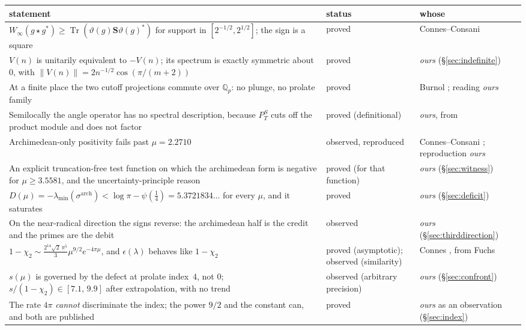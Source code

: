 \documentclass[11pt,a4paper]{article}
\theoremstyle{plain}
\theoremstyle{definition}
\theoremstyle{remark}
\newcommand{\Q}{\mathbb{Q}}
\newcommand{\Sonin}{\mathbf{S}}
\begin{document}
\begin{center}\small
\begin{tabular}{@{}p{}p{}p{}@{}}
\hline
statement & status & whose \\
\hline
$W_\infty(g\star g^*)\ge\operatorname{Tr}(\vartheta(g)\Sonin\vartheta(g)^*)$ for
support in $[2^{-1/2},2^{1/2}]$; the sign is a square
& proved & Connes--Consani \cite{CC2021} \\
$V(n)$ is unitarily equivalent to $-V(n)$; its spectrum is exactly symmetric
about $0$, with $\|V(n)\|=2n^{-1/2}\cos(\pi/(m+2))$
& proved & \emph{ours} (\S\ref{sec:indefinite}) \\
At a finite place the two cutoff projections commute over $\Q_p$: no plunge, no
prolate family
& proved & Burnol \cite{Burnol1999}; reading \emph{ours} \\
Semilocally the angle operator has no spectral description, because $P^S_T$ cuts
off the product module and does not factor
& proved (definitional) & \emph{ours}, from \cite{Connes2026,CCM2023} \\
Archimedean-only positivity fails past $\mu=2.2710$
& observed, reproduced & Connes--Consani \cite{CC2023}; reproduction \emph{ours} \\
An explicit truncation-free test function on which the archimedean form is
negative for $\mu\ge3.5581$, and the uncertainty-principle reason
& proved (for that function) & \emph{ours} (\S\ref{sec:witness}) \\
$D(\mu)=-\lambda_{\min}(\sigma^{\mathrm{arch}})<\log\pi-\psi(\tfrac14)=5.3721834\ldots$
for every $\mu$, and it saturates
& proved & \emph{ours} (\S\ref{sec:deficit}) \\
On the near-radical direction the signs reverse: the archimedean half is the
credit and the primes are the debit
& observed & \emph{ours} (\S\ref{sec:thirddirection}) \\
$1-\chi_2\sim\frac{2^{14}\sqrt2\,\pi^5}{3}\mu^{9/2}e^{-4\pi\mu}$, and
$\epsilon(\lambda)$ behaves like $1-\chi_2$
& proved (asymptotic); observed (similarity) & Connes \cite{Connes2026}, from
Fuchs \cite{Fuchs1964} \\
$s(\mu)$ is governed by the defect at prolate index~$4$, not $0$;
$s/(1-\chi_2)\in[7.1,\,9.9]$ after extrapolation, with no trend
& observed (arbitrary precision) & \emph{ours} (\S\ref{sec:confront}) \\
The rate $4\pi$ \emph{cannot} discriminate the index; the power $9/2$ and the
constant can, and both are published
& proved & \emph{ours} as an observation (\S\ref{sec:index}) \\

\end{tabular}
\end{center}
\end{document}
